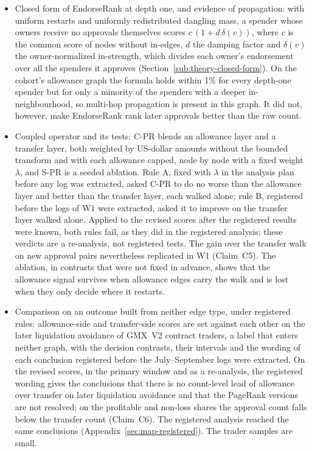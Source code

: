 \begin{itemize}
\item Closed form of EndorseRank at depth one, and evidence of propagation: with uniform restarts and uniformly redistributed dangling mass, a spender whose owners receive no approvals themselves scores $c\,(1+d\,\delta(v))$, where $c$ is the common score of nodes without in-edges, $d$ the damping factor and $\delta(v)$ the owner-normalized in-strength, which divides each owner's endorsement over all the spenders it approves (Section~\ref{sub:theory-closed-form}). On the cohort's allowance graph the formula holds within 1\% for every depth-one spender but for only a minority of the spenders with a deeper in-neighbourhood, so multi-hop propagation is present in this graph. It did not, however, make EndorseRank rank later approvals better than the raw count.
\item Coupled operator and its tests: C-PR blends an allowance layer and a transfer layer, both weighted by US-dollar amounts without the bounded transform and with each allowance capped, node by node with a fixed weight $\lambda$, and S-PR is a seeded ablation. Rule A, fixed with $\lambda$ in the analysis plan before any log was extracted, asked C-PR to do no worse than the allowance layer and better than the transfer layer, each walked alone; rule B, registered before the logs of W1 were extracted, asked it to improve on the transfer layer walked alone. Applied to the revised scores after the registered results were known, both rules fail, as they did in the registered analysis; these verdicts are a re-analysis, not registered tests. The gain over the transfer walk on new approval pairs nevertheless replicated in W1 (Claim~C5). The ablation, in contrasts that were not fixed in advance, shows that the allowance signal survives when allowance edges carry the walk and is lost when they only decide where it restarts.
\item Comparison on an outcome built from neither edge type, under registered rules: allowance-side and transfer-side scores are set against each other on the later liquidation avoidance of GMX~V2 contract traders, a label that enters neither graph, with the decision contrasts, their intervals and the wording of each conclusion registered before the July--September logs were extracted. On the revised scores, in the primary window and as a re-analysis, the registered wording gives the conclusions that there is no count-level lead of allowance over transfer on later liquidation avoidance and that the PageRank versions are not resolved; on the profitable and non-loss shares the approval count falls below the transfer count (Claim~C6). The registered analysis reached the same conclusions (Appendix~\ref{sec:map-registered}). The trader samples are small.
\end{itemize}



